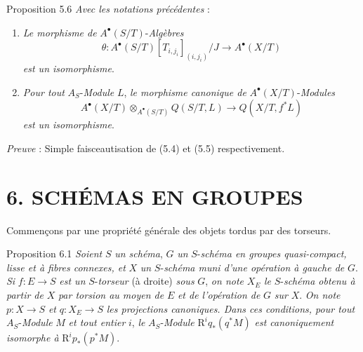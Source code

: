 \begin{statement}{Proposition 5.6}
\emph{Avec les notations précédentes} :
\begin{enumerate}[label=\alph*)]
\item \emph{Le morphisme de} $A^\bullet(S/T)$-\emph{Algèbres}
\[
\theta:A^\bullet(S/T)[T_{i,j_i}]_{(i,j_i)}/J\to A^\bullet(X/T)
\]
\emph{est un isomorphisme}.
\item \emph{Pour tout} $A_S$-\emph{Module} $L$, \emph{le morphisme canonique de} $A^\bullet(X/T)$-\emph{Modules}
\[
A^\bullet(X/T)\otimes_{A^\bullet(S/T)}Q(S/T,L)\to Q(X/T,f^*L)
\]
\emph{est un isomorphisme}.
\end{enumerate}
\end{statement}

\emph{Preuve} : Simple faisceautisation de (5.4) et (5.5) respectivement.

\section*{6. SCHÉMAS EN GROUPES}

Commençons par une propriété générale des objets tordus par des torseurs.

\begin{statement}{Proposition 6.1}
\emph{Soient} $S$ \emph{un schéma}, $G$ \emph{un} $S$-\emph{schéma en groupes quasi-compact, lisse et à fibres connexes, et} $X$ \emph{un} $S$-\emph{schéma muni d'une opération à gauche de} $G$. \emph{Si} $f:E\to S$ \emph{est un} $S$-\emph{torseur} (à droite) \emph{sous} $G$, \emph{on note} $X_E$ \emph{le} $S$-\emph{schéma obtenu à partir de} $X$ \emph{par torsion au moyen de} $E$ \emph{et de l'opération de} $G$ \emph{sur} $X$. \emph{On note} $p:X\to S$ \emph{et} $q:X_E\to S$ \emph{les projections canoniques. Dans ces conditions, pour tout} $A_S$-\emph{Module} $M$ \emph{et tout entier} $i$, \emph{le} $A_S$-\emph{Module} $\mathrm{R}^iq_*(q^*M)$ \emph{est canoniquement isomorphe à} $\mathrm{R}^ip_*(p^*M)$.
\end{statement}

